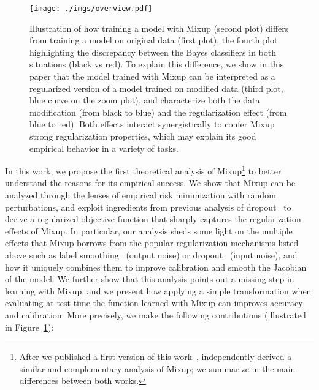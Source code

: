 \documentclass[twoside,11pt]{article}
\newcommand{\rev}[1]{{#1}}
\begin{document}
\begin{figure}
    \centering
    \texttt{[image: ./imgs/overview.pdf]}
    \caption{\small
        Illustration of how training a model with Mixup (second plot) differs from training 
        a model on original data (first plot), the fourth plot highlighting the discrepancy between 
        the Bayes classifiers in both situations (black vs red). 
        To explain this difference, we show in this paper that the model trained with Mixup 
        can be interpreted as a regularized version of a model trained on modified data 
        (third plot, blue curve on the zoom plot), and characterize both the data modification 
        (from black to blue)  and the regularization effect (from blue to red). 
        Both effects interact synergistically to confer Mixup strong regularization properties, 
        which may explain its good empirical behavior in a variety of tasks.
        }
    \label{fig:overview}
    \vspace{-1\baselineskip}
\end{figure}
In this work, we propose the first theoretical analysis of Mixup\footnote{\rev{After we published a first version of this work~\citep{Carratino2020Mixup}, \citet{Zhang2021HowDM} independently derived a similar and complementary analysis of Mixup; we summarize in \Cref{sec:discussion} the main differences between both works.}} to better understand the reasons for its empirical success. 
We show that Mixup can be analyzed through the lenses of empirical risk minimization with random perturbations, 
and exploit ingredients from previous analysis of dropout~\citep{wager2013dropout, khalfaoui2019asni, wei2020implicit} 
to derive a regularized objective function that sharply captures the regularization effects of Mixup. 
In particular, our analysis sheds some light on the multiple effects that Mixup borrows from the popular 
regularization mechanisms listed above such as label smoothing~\citep{pereyra2017regularizing} (output noise) or  
dropout~\citep{srivastava2014dropout} (input noise), and how it uniquely combines them to improve calibration and 
smooth the Jacobian of the model.
We further show that this analysis points out a missing step in learning with Mixup, and we present 
how applying a simple transformation when evaluating at test time the function learned with Mixup
can improves accuracy and calibration.
More precisely, we make the following contributions (illustrated in Figure~\ref{fig:overview}):
\end{document}
